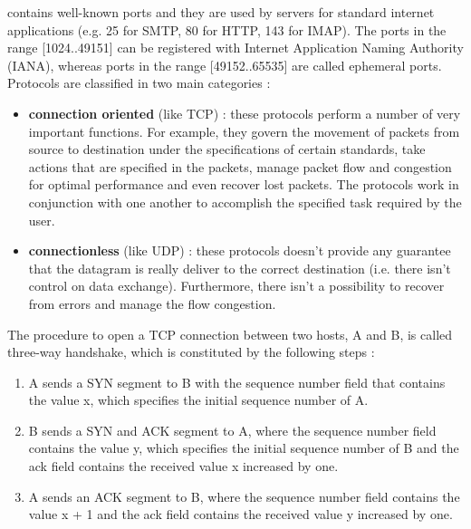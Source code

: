 \documentclass[11pt]{article}
\begin{document}
contains well-known ports and they are used by servers for standard internet applications (e.g. 25 for SMTP, 80 for HTTP, 143 for IMAP). The ports in the range [1024..49151] can be registered with Internet Application Naming Authority (IANA), whereas ports in the range [49152..65535] are called ephemeral ports. Protocols are classified in two main categories :
\begin{itemize}
\item \textbf{connection oriented} (like TCP) : these protocols perform a number of very important functions. For example, they govern the movement of packets from source to destination under the specifications of certain standards, take actions that are specified in the packets, manage packet flow and congestion for optimal performance and even recover lost packets. The protocols work in conjunction with one another to accomplish the specified task required by the user.
\item \textbf{connectionless} (like UDP) : these protocols doesn't provide any guarantee that the datagram is really deliver to the correct destination (i.e. there isn't control on data exchange). Furthermore, there isn't a possibility to recover from errors and manage the flow congestion.
\end{itemize}
The procedure to open a TCP connection between two hosts, A and B, is called three-way handshake, which is constituted by the following steps :
\begin{enumerate}
\item A sends a SYN segment to B with the sequence number field that contains the value x, which specifies the initial sequence number of A.
\item B sends a SYN and ACK segment to A, where the sequence number field contains the value y, which specifies the initial sequence number of B and the ack field contains the received value x increased by one.
\item A sends an ACK segment to B, where the sequence number field contains the value x + 1 and the ack field contains the received value y increased by one.
\end{enumerate}
\end{document}
